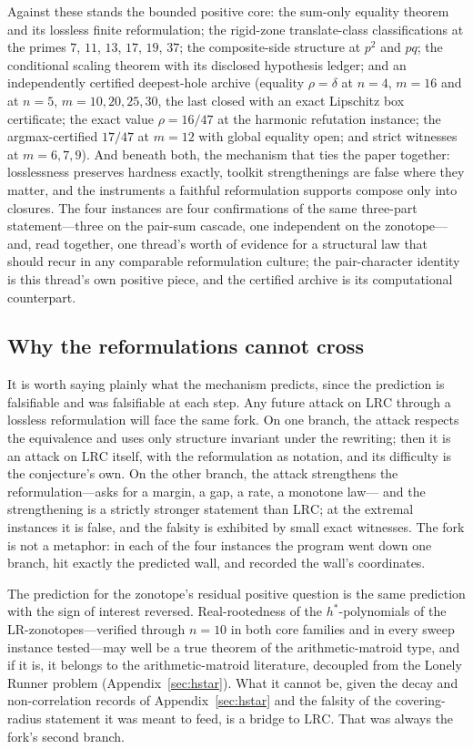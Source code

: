 \documentclass[11pt,a4paper]{article}
\numberwithin{equation}{section}
\theoremstyle{plain}
\theoremstyle{definition}
\theoremstyle{remark}
\newcommand{\lrc}{\mathrm{LRC}}
\begin{document}
Against these stands the bounded positive core: the sum-only equality
theorem and its lossless finite reformulation; the rigid-zone
translate-class classifications at the primes $7$, $11$, $13$, $17$,
$19$, $37$; the composite-side structure at $p^2$ and $pq$; the
conditional scaling theorem with its disclosed hypothesis ledger; and an
independently certified deepest-hole archive (equality $\rho=\delta$ at
$n=4$, $m=16$ and at $n=5$, $m=10,20,25,30$, the last closed with an
exact Lipschitz box certificate; the exact value $\rho=16/47$ at the
harmonic refutation instance; the argmax-certified $17/47$ at $m=12$
with global equality open; and strict witnesses at $m=6,7,9$). And
beneath both, the mechanism that ties the paper together: losslessness
preserves hardness exactly, toolkit strengthenings are false where they
matter, and the instruments a faithful reformulation supports compose
only into closures. The four instances are four confirmations of the
same three-part statement---three on the pair-sum cascade, one
independent on the zonotope---and, read together, one thread's worth of
evidence for a structural law that should recur in any comparable
reformulation culture; the pair-character identity is this thread's own
positive piece, and the certified archive is its computational
counterpart.

\subsection{Why the reformulations cannot cross}

It is worth saying plainly what the mechanism predicts, since the
prediction is falsifiable and was falsifiable at each step. Any future
attack on $\lrc$ through a lossless reformulation will face the same
fork. On one branch, the attack respects the equivalence and uses only
structure invariant under the rewriting; then it is an attack on
$\lrc$ itself, with the reformulation as notation, and its difficulty
is the conjecture's own. On the other branch, the attack strengthens
the reformulation---asks for a margin, a gap, a rate, a monotone law---
and the strengthening is a strictly stronger statement than $\lrc$;
at the extremal instances it is false, and the falsity is exhibited by
small exact witnesses. The fork is not a metaphor: in each of the four
instances the program went down one branch, hit exactly the predicted
wall, and recorded the wall's coordinates.

The prediction for the zonotope's residual positive question is the same
prediction with the sign of interest reversed. Real-rootedness of the
$h^*$-polynomials of the LR-zonotopes---verified through $n=10$ in both
core families and in every sweep instance tested---may well be a true
theorem of the arithmetic-matroid type, and if it is, it belongs to the
arithmetic-matroid literature, decoupled from the Lonely Runner problem
(Appendix~\ref{sec:hstar}). What it cannot be, given the decay and
non-correlation records of Appendix~\ref{sec:hstar} and the falsity of
the covering-radius statement it was meant to feed, is a bridge to
$\lrc$. That was always the fork's second branch.
\end{document}
